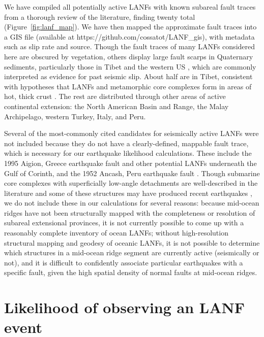 \documentclass[draft,grl]{AGUTeX}
\begin{document}
\begin{article}
We have compiled all potentially active LANFs with known subareal fault traces
from a thorough review of the literature, finding twenty total
(Figure~\ref{fig:lanf_map}).  We have then mapped the approximate fault traces
into a GIS file (available at https://github.com/cossatot/LANF\_gis), with
metadata such as slip rate and source. Though the fault traces of many LANFs
considered here are obscured by vegetation, others display large fault scarps
in Quaternary sediments, particularly those in Tibet
\citep[e.g.,][]{styron2013slr, kapp2005nqtl} and the western US
\citep[e.g.,][]{axen1999baja, hayman2003dv}, which are commonly interpreted as
evidence for past seismic slip.  About half are in Tibet, consistent with
hypotheses that LANFs and metamorphic core complexes form in areas of hot,
thick crust \citep [e.g.,][]{buck1991mcc}.  The rest are distributed through
other areas of active continental extension: the North American Basin and
Range, the Malay Archipelago, western Turkey, Italy, and Peru. 

Several of the most-commonly cited candidates for seismically active LANFs were
not included because they do not have a clearly-defined, mappable fault trace,
which is necessary for our earthquake likelihood calculations.  These include
the 1995 Aigion, Greece earthquake fault \citep{bernard1997} and other
potential LANFs underneath the Gulf of Corinth, and the 1952 Ancash, Peru
earthquake fault \citep{doser1987ancash}. Though submarine core complexes with
superficially low-angle detachments are well-described in the literature and
some of these structures may have produced recent earthquakes
\citep{abers2001}, we do not include these in our calculations for several
reasons: because mid-ocean ridges have not been structurally mapped with the
completeness or resolution of subareal extensional provinces, it is not
currently possible to come up with a reasonably complete inventory of ocean
LANFs; without high-resolution structural mapping and geodesy of oceanic LANFs,
it is not possible to determine which structures in a mid-ocean ridge segment
are currently active (seismically or not), and it is difficult to confidently
associate particular earthquakes with a specific fault, given the high spatial
density of normal faults at mid-ocean ridges.


\section{Likelihood of observing an LANF event}

\end{article}
\end{document}

